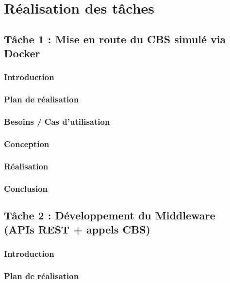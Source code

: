 \chapter{Réalisation des tâches}

\section{Tâche 1 : Mise en route du CBS simulé via Docker}

\subsection*{Introduction}

\subsection*{Plan de réalisation}

\subsection*{Besoins / Cas d'utilisation}

\subsection*{Conception}

\subsection*{Réalisation}

\subsection*{Conclusion}

\section{Tâche 2 : Développement du Middleware (APIs REST + appels CBS)}

\subsection*{Introduction}

\subsection*{Plan de réalisation}

